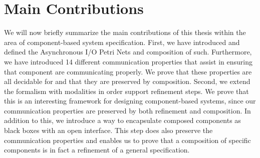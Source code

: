 \section{Main Contributions}
We will now briefly summarize the main contributions of this thesis within the area of component-based system specification.
First, we have introduced and defined the Asynchronous I/O Petri Nets and composition of such. Furthermore, we have introduced 14 different communication properties that assist in ensuring that component are communicating properly. We prove that these properties are all decidable for \AIOPNs and that they are preserved by composition. Second, we extend the \AIOPN formalism with modalities in order support refinement steps. We prove that this is an interesting framework for designing component-based systems, since our communication properties are preserved by both refinement and composition. In addition to this, we introduce a way to encapsulate composed components as black boxes with an open interface. This step does also preserve the communication properties and enables us to prove that a composition of specific components is in fact a refinement of a general specification.